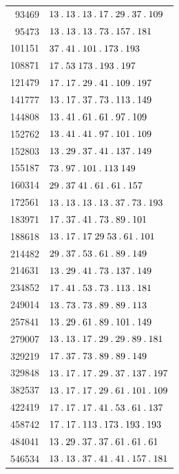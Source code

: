 \begin{longtable}{@{}r|l@{}}
93469 & $13\pdot 13\pdot 13\pdot 17\pdot 29\pdot 37\pdot 109$\\
95473 & $13\pdot 13\pdot 13\pdot 73\pdot 157\pdot 181$\\
101151 & $37\pdot 41\pdot 101\pdot 173\pdot 193$\\
108871 & $17\pdot 53\;173\pdot 193\pdot 197$\\
121479 & $17\pdot 17\pdot 29\pdot 41\pdot 109\pdot 197$\\
141777 & $13\pdot 17\pdot 37\pdot 73\pdot 113\pdot 149$\\
144808 & $13\pdot 41\pdot 61\pdot 61\pdot 97\pdot 109$\\
152762 & $13\pdot 41\pdot 41\pdot 97\pdot 101\pdot 109$\\
152803 & $13\pdot 29\pdot 37\pdot 41\pdot 137\pdot 149$\\
155187 & $73\pdot 97\pdot 101\pdot 113\;149$\\
160314 & $29\pdot 37\;41\pdot 61\pdot 61\pdot 157$\\
172561 & $13\pdot 13\pdot 13\pdot 13\pdot 37\pdot 73\pdot 193$\\
183971 & $17\pdot 37\pdot 41\pdot 73\pdot 89\pdot 101$\\
188618 & $13\pdot 17\pdot 17\;29\;53\pdot 61\pdot 101$\\
214482 & $29\pdot 37\pdot 53\pdot 61\pdot 89\pdot 149$\\
214631 & $13\pdot 29\pdot 41\pdot 73\pdot 137\pdot 149$\\
234852 & $17\pdot 41\pdot 53\pdot 73\pdot 113\pdot 181$\\
249014 & $13\pdot 73\pdot 73\pdot 89\pdot 89\pdot 113$\\
257841 & $13\pdot 29\pdot 61\pdot 89\pdot 101\pdot 149$\\
279007 & $13\pdot 13\pdot 17\pdot 29\pdot 29\pdot 89\pdot 181$\\
329219 & $17\pdot 37\pdot 73\pdot 89\pdot 89\pdot 149$\\
329848 & $13\pdot 17\pdot 17\pdot 29\pdot 37\pdot 137\pdot 197$\\
382537 & $13\pdot 17\pdot 17\pdot 29\pdot 61\pdot 101\pdot 109$\\
422419 & $17\pdot 17\pdot 17\pdot 41\pdot 53\pdot 61\pdot 137$\\
458742 & $17\pdot 17\pdot 113\pdot 173\pdot 193\pdot 193$\\
484041 & $13\pdot 29\pdot 37\pdot 37\pdot 61\pdot 61\pdot 61$\\
546534 & $13\pdot 13\pdot 37\pdot 41\pdot 41\pdot 157\pdot 181$\\

\end{longtable}
